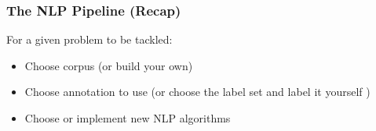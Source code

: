

\begin{frame}[fragile]
\frametitle{The NLP Pipeline (Recap)}
For a given problem to be tackled:
\begin{itemize}
\item Choose corpus (or build your own)
\item Choose annotation to use (or choose the label set and label it yourself )
\item Choose or implement new NLP algorithms
\end{itemize}
\end{frame}

